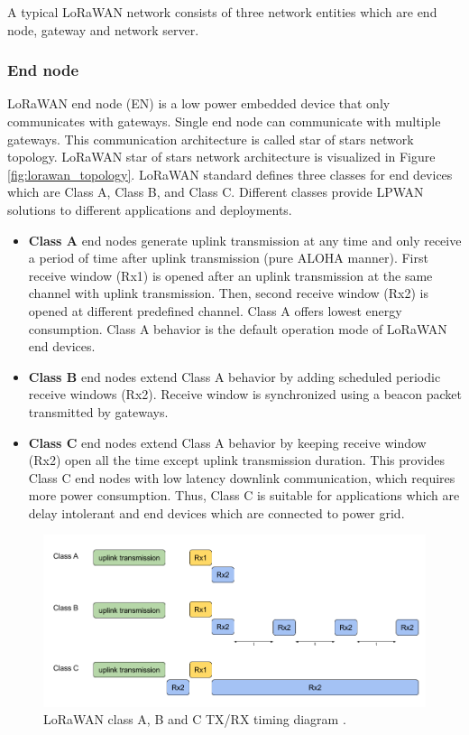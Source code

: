 A typical LoRaWAN network consists of three network entities which are end node, gateway and network server.

\subsubsection{End node}

LoRaWAN end node (EN) is a low power embedded device that only communicates with gateways. Single end node can communicate with multiple gateways. This communication architecture is called star of stars network topology. LoRaWAN star of stars network architecture is visualized in Figure \ref{fig:lorawan_topology}. LoRaWAN standard defines three classes for end devices which are Class A, Class B, and Class C. Different classes provide LPWAN solutions to different applications and deployments.

\begin{itemize}
  \item \textbf{Class A} end nodes generate uplink transmission at any time and only receive a period of time after uplink transmission (pure ALOHA manner). First receive window (Rx1) is opened after an uplink transmission at the same channel with uplink transmission. Then, second receive window (Rx2) is opened at different predefined channel. Class A offers lowest energy consumption. Class A behavior is the default operation mode of LoRaWAN end devices.
  \item \textbf{Class B} end nodes extend Class A behavior by adding scheduled periodic receive windows (Rx2). Receive window is synchronized using a beacon packet transmitted by gateways.
  \item \textbf{Class C} end nodes extend Class A behavior by keeping receive window (Rx2) open all the time except uplink transmission duration. This provides Class C end nodes with low latency downlink communication, which requires more power consumption. Thus, Class C is suitable for applications which are delay intolerant and end devices which are connected to power grid.
\end{itemize}

\begin{figure}
\centering
\includegraphics[width=\linewidth]{fig/lorawan_class.png}
\vspace*{4mm}
\caption{LoRaWAN class A, B and C TX/RX timing diagram \cite{witekio}.}
\label{fig:lorawan_class}
\end{figure}

